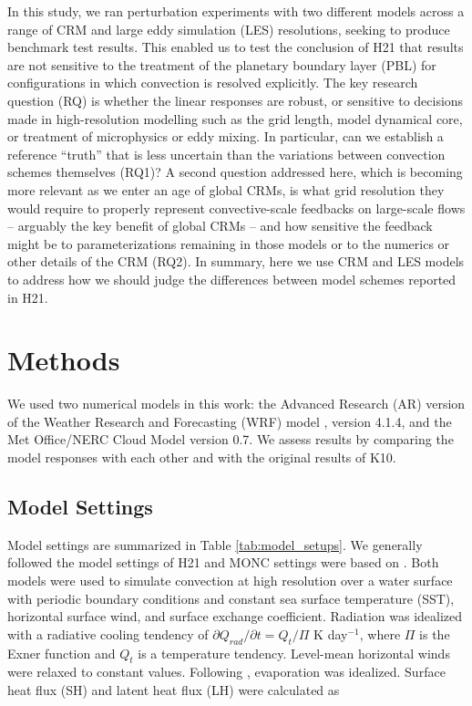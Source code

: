 \documentclass[draft]{agujournal2019}
\begin{document}
In this study, we ran perturbation experiments with two different models across
a range of CRM and large eddy simulation (LES) resolutions, seeking to produce
benchmark test results. This enabled us to test the conclusion of H21 that
results are not sensitive to the treatment of the planetary boundary layer (PBL)
for configurations in which convection is resolved explicitly. The key research
question (RQ) is whether the linear responses are robust, or sensitive to
decisions made in high-resolution modelling such as the grid length, model
dynamical core, or treatment of microphysics or eddy mixing. In particular, can
we establish a reference ``truth'' that is less uncertain than the variations
between convection schemes themselves (RQ1)? A second question addressed here,
which is becoming more relevant as we enter an age of global CRMs, is what grid
resolution they would require to properly represent convective-scale feedbacks
on large-scale flows -- arguably the key benefit of global CRMs -- and how
sensitive the feedback might be to parameterizations remaining in those models
or to the numerics or other details of the CRM (RQ2). In summary, here we use
CRM and LES models to address how we should judge the differences between model
schemes reported in H21.

\section{Methods}
\label{sec:methods}

We used two numerical models in this work: the Advanced Research (AR) version of
the Weather Research and Forecasting (WRF) model \cite{Skamarock_2019}, version
4.1.4, and the Met Office/NERC Cloud Model \cite<MONC,>{Brown_2020} version 0.7.
We assess results by comparing the model responses with each other and with the
original results of K10.

\subsection{Model Settings}

Model settings are summarized in Table \ref{tab:model_setups}. We generally
followed the model settings of H21 and MONC settings were based on
.  Both models were used to simulate convection at high
resolution over a water surface with periodic boundary conditions and constant
sea surface temperature (SST), horizontal surface wind, and surface exchange
coefficient. Radiation was idealized \cite{Herman_JAMES_2013} with a radiative
cooling tendency of $\partial Q_{rad} / \partial t = Q_t/\Pi$ K day$^{-1}$,
where $\Pi$ is the Exner function and $Q_t$ is a temperature tendency.
Level-mean horizontal winds were relaxed to constant values. Following
, evaporation was idealized. Surface heat flux (SH) and
latent heat flux (LH) were calculated as
\end{document}
